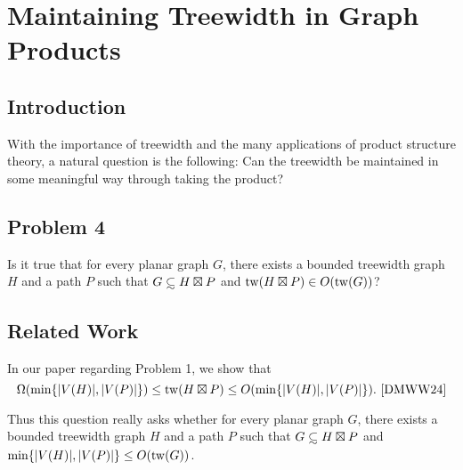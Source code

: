 \documentclass[../main.tex]{subfiles}
\begin{document}
	
	\section{Maintaining Treewidth in Graph Products}
	\subsection{Introduction}
	With the importance of treewidth and the many applications of product structure theory, a natural question is the following: Can the treewidth be maintained in some meaningful way through taking the product? 
	\subsection{Problem 4}
	  Is it true that for every planar graph $G$, there exists a bounded treewidth graph $H$ and a path $P$ such that $G \subsetsim H\boxtimes P$ and $\operatorname{tw}(H\boxtimes P) \in O(\operatorname{tw}(G))$? 
	
	\subsection{Related Work}
	In our paper regarding Problem 1, we show that $$\Omega(\min\{|V(H)|,|V(P)|\})\leq  \tw( H\boxtimes P) \leq O(\min\{|V(H)|,|V(P)|\}).~\text{\cite[Lemma~3, Equation~(2)]{DMWW24}}$$ 
	
	Thus this question really asks whether for every planar graph $G$, there exists a bounded treewidth graph $H$ and a path $P$ such that $G\subsetsim H\boxtimes P$ and $\min\{|V(H)|,|V(P)|\} \leq O(\operatorname{tw}(G))$. 
	
	
	
\end{document}
